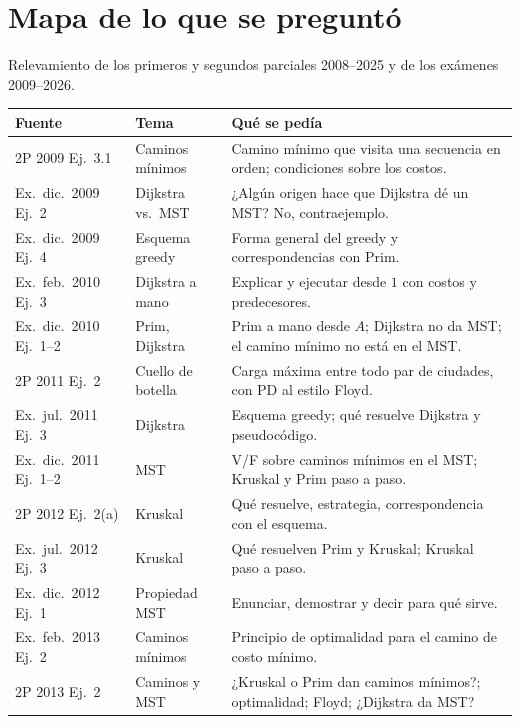 \section{Mapa de lo que se preguntó}

Relevamiento de los primeros y segundos parciales 2008--2025 y de los exámenes 2009--2026.

\begin{center}
\small
\begin{tabularx}{\textwidth}{@{}>{\raggedright\arraybackslash}p{2.8cm}>{\raggedright\arraybackslash}p{2.4cm}>{\raggedright\arraybackslash}X@{}}
\toprule
Fuente & Tema & Qué se pedía \\
\midrule
2P 2009 Ej.~3.1 & Caminos mínimos & Camino mínimo que visita una secuencia en orden; condiciones sobre los costos. \\
Ex.\ dic.~2009 Ej.~2 & Dijkstra vs.\ MST & ¿Algún origen hace que Dijkstra dé un MST? No, contraejemplo. \\
Ex.\ dic.~2009 Ej.~4 & Esquema greedy & Forma general del greedy y correspondencias con Prim. \\
Ex.\ feb.~2010 Ej.~3 & Dijkstra a mano & Explicar y ejecutar desde $1$ con costos y predecesores. \\
Ex.\ dic.~2010 Ej.~1--2 & Prim, Dijkstra & Prim a mano desde $A$; Dijkstra no da MST; el camino mínimo no está en el MST. \\
2P 2011 Ej.~2 & Cuello de botella & Carga máxima entre todo par de ciudades, con PD al estilo Floyd. \\
Ex.\ jul.~2011 Ej.~3 & Dijkstra & Esquema greedy; qué resuelve Dijkstra y pseudocódigo. \\
Ex.\ dic.~2011 Ej.~1--2 & MST & V/F sobre caminos mínimos en el MST; Kruskal y Prim paso a paso. \\
2P 2012 Ej.~2(a) & Kruskal & Qué resuelve, estrategia, correspondencia con el esquema. \\
Ex.\ jul.~2012 Ej.~3 & Kruskal & Qué resuelven Prim y Kruskal; Kruskal paso a paso. \\
Ex.\ dic.~2012 Ej.~1 & Propiedad MST & Enunciar, demostrar y decir para qué sirve. \\
Ex.\ feb.~2013 Ej.~2 & Caminos mínimos & Principio de optimalidad para el camino de costo mínimo. \\
2P 2013 Ej.~2 & Caminos y MST & ¿Kruskal o Prim dan caminos mínimos?; optimalidad; Floyd; ¿Dijkstra da MST? \\

\end{tabularx}
\end{center}

